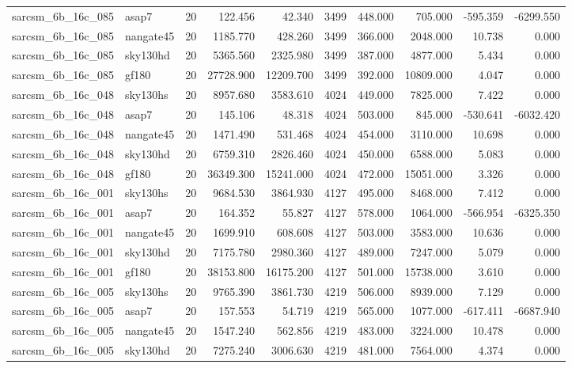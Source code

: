 \documentclass{article}
\begin{document}
\begin{longtable}{llrrrrrrrr}
sarcsm\_6b\_16c\_085 & asap7 & 20 & 122.456 & 42.340 & 3499 & 448.000 & 705.000 & -595.359 & -6299.550 \\
sarcsm\_6b\_16c\_085 & nangate45 & 20 & 1185.770 & 428.260 & 3499 & 366.000 & 2048.000 & 10.738 & 0.000 \\
sarcsm\_6b\_16c\_085 & sky130hd & 20 & 5365.560 & 2325.980 & 3499 & 387.000 & 4877.000 & 5.434 & 0.000 \\
sarcsm\_6b\_16c\_085 & gf180 & 20 & 27728.900 & 12209.700 & 3499 & 392.000 & 10809.000 & 4.047 & 0.000 \\
sarcsm\_6b\_16c\_048 & sky130hs & 20 & 8957.680 & 3583.610 & 4024 & 449.000 & 7825.000 & 7.422 & 0.000 \\
sarcsm\_6b\_16c\_048 & asap7 & 20 & 145.106 & 48.318 & 4024 & 503.000 & 845.000 & -530.641 & -6032.420 \\
sarcsm\_6b\_16c\_048 & nangate45 & 20 & 1471.490 & 531.468 & 4024 & 454.000 & 3110.000 & 10.698 & 0.000 \\
sarcsm\_6b\_16c\_048 & sky130hd & 20 & 6759.310 & 2826.460 & 4024 & 450.000 & 6588.000 & 5.083 & 0.000 \\
sarcsm\_6b\_16c\_048 & gf180 & 20 & 36349.300 & 15241.000 & 4024 & 472.000 & 15051.000 & 3.326 & 0.000 \\
sarcsm\_6b\_16c\_001 & sky130hs & 20 & 9684.530 & 3864.930 & 4127 & 495.000 & 8468.000 & 7.412 & 0.000 \\
sarcsm\_6b\_16c\_001 & asap7 & 20 & 164.352 & 55.827 & 4127 & 578.000 & 1064.000 & -566.954 & -6325.350 \\
sarcsm\_6b\_16c\_001 & nangate45 & 20 & 1699.910 & 608.608 & 4127 & 503.000 & 3583.000 & 10.636 & 0.000 \\
sarcsm\_6b\_16c\_001 & sky130hd & 20 & 7175.780 & 2980.360 & 4127 & 489.000 & 7247.000 & 5.079 & 0.000 \\
sarcsm\_6b\_16c\_001 & gf180 & 20 & 38153.800 & 16175.200 & 4127 & 501.000 & 15738.000 & 3.610 & 0.000 \\
sarcsm\_6b\_16c\_005 & sky130hs & 20 & 9765.390 & 3861.730 & 4219 & 506.000 & 8939.000 & 7.129 & 0.000 \\
sarcsm\_6b\_16c\_005 & asap7 & 20 & 157.553 & 54.719 & 4219 & 565.000 & 1077.000 & -617.411 & -6687.940 \\
sarcsm\_6b\_16c\_005 & nangate45 & 20 & 1547.240 & 562.856 & 4219 & 483.000 & 3224.000 & 10.478 & 0.000 \\
sarcsm\_6b\_16c\_005 & sky130hd & 20 & 7275.240 & 3006.630 & 4219 & 481.000 & 7564.000 & 4.374 & 0.000 \\

\end{longtable}
\end{document}
